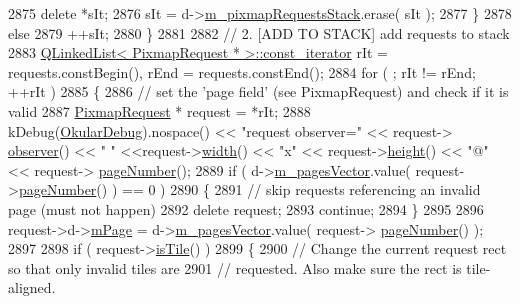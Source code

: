 \begin{DoxyCode}
2875             \textcolor{keyword}{delete} *sIt;
2876             sIt = d->\hyperlink{classOkular_1_1DocumentPrivate_af903e531960617af53b4bc79b3a95efa}{m\_pixmapRequestsStack}.erase( sIt );
2877         \}
2878         \textcolor{keywordflow}{else}
2879             ++sIt;
2880     \}
2881 
2882     \textcolor{comment}{// 2. [ADD TO STACK] add requests to stack}
2883     \hyperlink{classQLinkedList}{QLinkedList< PixmapRequest * >::const\_iterator} rIt = 
      requests.constBegin(), rEnd = requests.constEnd();
2884     \textcolor{keywordflow}{for} ( ; rIt != rEnd; ++rIt )
2885     \{
2886         \textcolor{comment}{// set the 'page field' (see PixmapRequest) and check if it is valid}
2887         \hyperlink{classOkular_1_1PixmapRequest}{PixmapRequest} * request = *rIt;
2888         kDebug(\hyperlink{debug__p_8h_af16c6e32a95969dd0605d792ec9807c7}{OkularDebug}).nospace() << \textcolor{stringliteral}{"request observer="} << request->
      \hyperlink{classOkular_1_1PixmapRequest_af7abb325ca484ded40c556cf0ad5b793}{observer}() << \textcolor{stringliteral}{" "} <<request->\hyperlink{classOkular_1_1PixmapRequest_a3e82f09b91a52efed7435eeb9903e5fc}{width}() << \textcolor{stringliteral}{"x"} << request->\hyperlink{classOkular_1_1PixmapRequest_a782392a2efc6303994c7e0158c76ee06}{height}() << \textcolor{stringliteral}{"@"} << request->
      \hyperlink{classOkular_1_1PixmapRequest_a50f959175182137dbb9e2dbd6ddd71aa}{pageNumber}();
2889         \textcolor{keywordflow}{if} ( d->\hyperlink{classOkular_1_1DocumentPrivate_a73b852d9a73ffe8061b66dbf9b290f17}{m\_pagesVector}.value( request->\hyperlink{classOkular_1_1PixmapRequest_a50f959175182137dbb9e2dbd6ddd71aa}{pageNumber}() ) == 0 )
2890         \{
2891             \textcolor{comment}{// skip requests referencing an invalid page (must not happen)}
2892             \textcolor{keyword}{delete} request;
2893             \textcolor{keywordflow}{continue};
2894         \}
2895 
2896         request->d->\hyperlink{classOkular_1_1PixmapRequestPrivate_a8de6dea67745c17947f997857c77ed07}{mPage} = d->\hyperlink{classOkular_1_1DocumentPrivate_a73b852d9a73ffe8061b66dbf9b290f17}{m\_pagesVector}.value( request->
      \hyperlink{classOkular_1_1PixmapRequest_a50f959175182137dbb9e2dbd6ddd71aa}{pageNumber}() );
2897 
2898         \textcolor{keywordflow}{if} ( request->\hyperlink{classOkular_1_1PixmapRequest_a7e50105623628d53dc9d82c45d7863bd}{isTile}() )
2899         \{
2900             \textcolor{comment}{// Change the current request rect so that only invalid tiles are}
2901             \textcolor{comment}{// requested. Also make sure the rect is tile-aligned.}

\end{DoxyCode}
